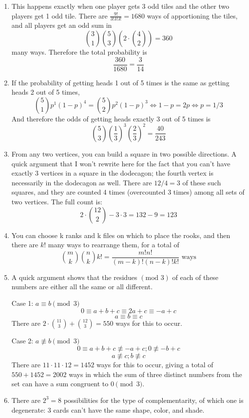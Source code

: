 \documentclass{book}
\numberwithin{equation}{section}
\begin{document}
\begin{enumerate}[label={2.\arabic*}]
\item
This happens exactly when one player gets 3 odd tiles and the other two players
get 1 odd tile. There are $\frac{9!}{3!3!3!} = 1680$ ways of apportioning the
tiles, and all players get an odd sum in
$${3 \choose 1} {5 \choose 3} (2 \cdot {4 \choose 2}) = 360$$
many ways. Therefore the total probability is
$$\frac{360}{1680} = \frac{3}{14}$$

\item
If the probability of getting heads 1 out of 5 times is the same as getting
heads 2 out of 5 times,
$${5 \choose 1}p^1 (1-p)^4 = {5 \choose 2}p^2 (1-p)^3 \iff 1-p = 2p \iff p = 1/3$$
And therefore the odds of getting heads exactly 3 out of 5 times is
$${5 \choose 3}(\frac{1}{3})^3 (\frac{2}{3})^2 = \frac{40}{243}$$

\item
From any two vertices, you can build a square in two possible directions.
A quick argument that I won't rewrite here for the fact that you
can't have exactly 3 vertices in a square in the dodecagon; the fourth
vertex is necessarily in the dodecagon as well. There are $12 / 4 = 3$ of 
these such squares, and they are counted 4 times (overcounted 3 times) among
all sets of two vertices. The full count is:
$$2 \cdot {12 \choose 2} - 3 \cdot 3 = 132 - 9 = 123$$

\item
You can choose k ranks and k files on which to place the rooks, and then
there are $k!$ many ways to rearrange them, for a total of
$${m \choose k}{n \choose k}k! = \frac{m!n!}{(m-k)!(n-k)!k!} \text{ ways}$$

\item
A quick argument shows that the residues $(\text{mod }3)$ of each of these
numbers are either all the same or all different.

Case 1: $a \equiv b \pmod{3}$
$$0 \equiv a + b + c \equiv 2a + c \equiv -a + c$$
$$a \equiv b \equiv c$$
There are $2 \cdot {11 \choose 3} + {12 \choose 3} = 550$ ways for this to occur.

Case 2: $a \not\equiv b \pmod{3}$
$$0 \equiv a + b + c \not\equiv -a + c; 0 \not\equiv -b + c$$
$$a \not\equiv c; b \not\equiv c$$
There are $11 \cdot 11 \cdot 12 = 1452$ ways for this to occur, giving a total
of $550 + 1452 = 2002$ ways in which the sum of three distinct numbers from the
set can have a sum congruent to $0 \pmod{3}$.

\item
There are $2^3=8$ possibilities for the type of complementarity, of which one
is degenerate: 3 cards can't have the same shape, color, and shade.


\end{enumerate}
\end{document}
